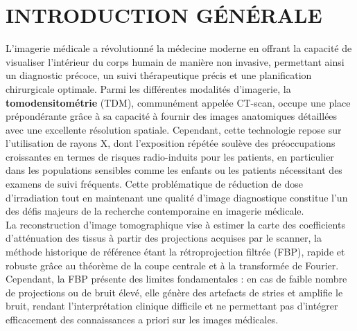 \chapter*{INTRODUCTION GÉNÉRALE}

L'imagerie médicale a révolutionné la médecine moderne en offrant la capacité de visualiser l'intérieur du corps humain de manière non invasive, permettant ainsi un diagnostic précoce, un suivi thérapeutique précis et une planification chirurgicale optimale. Parmi les différentes modalités d'imagerie, la \textbf{tomodensitométrie} (TDM), communément appelée CT-scan, occupe une place prépondérante grâce à sa capacité à fournir des images anatomiques détaillées avec une excellente résolution spatiale. Cependant, cette technologie repose sur l'utilisation de rayons X, dont l'exposition répétée soulève des préoccupations croissantes en termes de risques radio-induits pour les patients, en particulier dans les populations sensibles comme les enfants ou les patients nécessitant des examens de suivi fréquents. Cette problématique de réduction de dose d'irradiation tout en maintenant une qualité d'image diagnostique constitue l'un des défis majeurs de la recherche contemporaine en imagerie médicale.\\

La reconstruction d'image tomographique vise à estimer la carte des coefficients d'atténuation des tissus à partir des projections acquises par le scanner, la méthode historique de référence étant la rétroprojection filtrée (FBP), rapide et robuste grâce au théorème de la coupe centrale et à la transformée de Fourier. Cependant, la FBP présente des limites fondamentales : en cas de faible nombre de projections ou de bruit élevé, elle génère des artefacts de stries et amplifie le bruit, rendant l'interprétation clinique difficile et ne permettant pas d'intégrer efficacement des connaissances a priori sur les images médicales.\\



